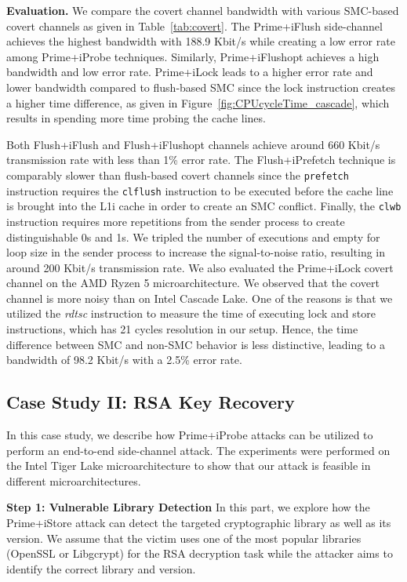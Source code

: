 \noindent\textbf{Evaluation.} We compare the covert channel bandwidth with various SMC-based covert channels as given in Table~\ref{tab:covert}. The Prime+iFlush side-channel achieves the highest bandwidth with 188.9 Kbit/s while creating a low error rate among Prime+iProbe techniques. Similarly, Prime+iFlushopt achieves a high bandwidth and low error rate. Prime+iLock leads to a higher error rate and lower bandwidth compared to flush-based SMC since the lock instruction creates a higher time difference, as given in Figure~\ref{fig:CPUcycleTime_cascade}, which results in spending more time probing the cache lines. 

Both Flush+iFlush and Flush+iFlushopt channels achieve around 660 Kbit/s transmission rate with less than 1\% error rate. The Flush+iPrefetch technique is comparably slower than flush-based covert channels since the \texttt{prefetch} instruction requires the \texttt{clflush} instruction to be executed before the cache line is brought into the L1i cache in order to create an SMC conflict. 
Finally, the \texttt{clwb} instruction requires more repetitions from the sender process to create distinguishable 0s and 1s. We tripled the number of executions and empty for loop size in the sender process to increase the signal-to-noise ratio, resulting in around 200 Kbit/s transmission rate. We also evaluated the Prime+iLock covert channel on the AMD Ryzen 5 microarchitecture. We observed that the covert channel is more noisy than on Intel Cascade Lake. One of the reasons is that we utilized the \textit{rdtsc} instruction to measure the time of executing lock and store instructions, which has 21 cycles resolution in our setup. Hence, the time difference between SMC and non-SMC behavior is less distinctive, leading to a bandwidth of 98.2 Kbit/s with a 2.5\% error rate.

\subsection{Case Study II: RSA Key Recovery}\label{subsec:case2}

In this case study, we describe how Prime+iProbe attacks can be utilized to perform an end-to-end side-channel attack. The experiments were performed on the Intel Tiger Lake microarchitecture to show that our attack is feasible in different microarchitectures.

\noindent\textbf{Step 1: Vulnerable Library Detection} In this part, we explore how the Prime+iStore attack can detect the targeted cryptographic library as well as its version. 
We assume that the victim uses one of the most popular libraries (OpenSSL or Libgcrypt) for the RSA decryption task while the attacker aims to identify the correct library and version. 


